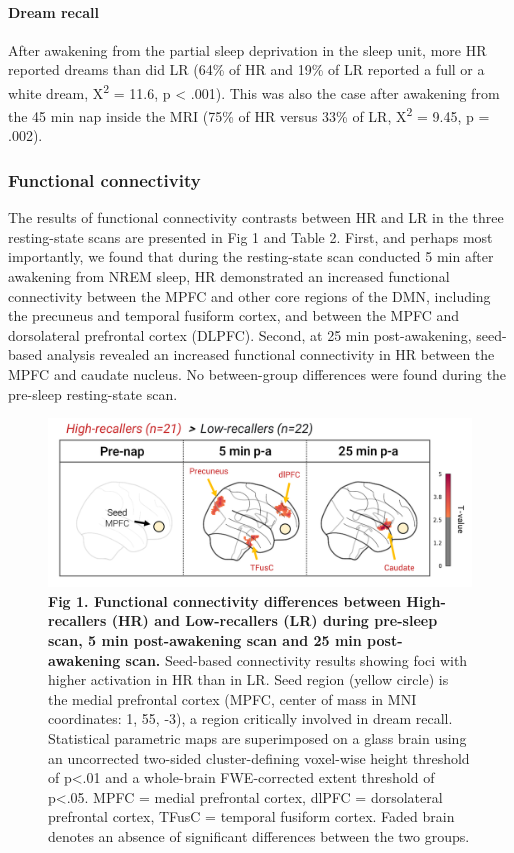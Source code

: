 \paragraph{Dream recall}
After awakening from the partial sleep deprivation in the sleep unit, more HR reported dreams than did LR (64\% of HR and 19\% of LR reported a full or a white dream, X\textsuperscript{2} = 11.6, p < .001). This was also the case after awakening from the 45 min nap inside the MRI (75\% of HR versus 33\% of LR, X\textsuperscript{2} = 9.45, p = .002).

\subsubsection*{Functional connectivity}
The results of functional connectivity contrasts between HR and LR in the three resting-state scans are presented in Fig 1 and Table 2. First, and perhaps most importantly, we found that during the resting-state scan conducted 5 min after awakening from NREM sleep, HR demonstrated an increased functional connectivity between the MPFC and other core regions of the DMN, including the precuneus and temporal fusiform cortex, and between the MPFC and dorsolateral prefrontal cortex (DLPFC). Second, at 25 min post-awakening, seed-based analysis revealed an increased functional connectivity in HR between the MPFC and caudate nucleus. No between-group differences were found during the pre-sleep resting-state scan.

\begin{figure}[!htbp]
	\includegraphics[width=\textwidth]{Fig/Results/Inertia/DRF/Fig1.png}
	\caption*{\textbf{Fig 1. Functional connectivity differences between High-recallers (HR) and Low-recallers (LR) during pre-sleep scan, 5 min post-awakening scan and 25 min post-awakening scan.} Seed-based connectivity results showing foci with higher activation in HR than in LR. Seed region (yellow circle) is the medial prefrontal cortex (MPFC, center of mass in MNI coordinates: 1, 55, -3), a region critically involved in dream recall. Statistical parametric maps are superimposed on a glass brain using an uncorrected two-sided cluster-defining voxel-wise height threshold of p<.01 and a whole-brain FWE-corrected extent threshold of p<.05. MPFC = medial prefrontal cortex, dlPFC = dorsolateral prefrontal cortex, TFusC = temporal fusiform cortex. Faded brain denotes an absence of significant differences between the two groups.}
\end{figure}

